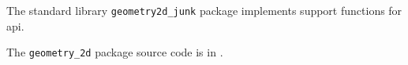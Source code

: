
The standard library {\tt geometry2d\_junk} package implements support functions for  api.

The {\tt geometry\_2d} package source code is in .



